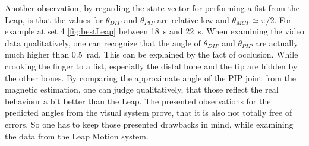 Another observation, by regarding the state vector for performing a fist from the Leap, is that the values for $ \theta_{DIP} $ and $ \theta_{PIP} $ are relative low and $ \theta_{MCP} \simeq \pi/2 $. For example at set 4 \ref{fig:bestLeap} between \SI{18}{\second} and \SI{22}{\second}. When examining the video data qualitatively, one can recognize that the angle of $ \theta_{DIP} $ and $ \theta_{PIP} $ are actually much higher than \SI{0.5}{\radian}. This can be explained by the fact of occlusion. While crooking the finger to a fist, especially the distal bone and the tip are hidden by the other bones. By comparing the approximate angle of the \ac{PIP} joint from the magnetic estimation, one can judge qualitatively, that those reflect the real behaviour a bit better than the Leap. The presented observations for the predicted angles from the visual system prove, that it is also not totally free of errors. So one has to keep those presented drawbacks in mind, while examining the data from the Leap Motion system.
\FloatBarrier


